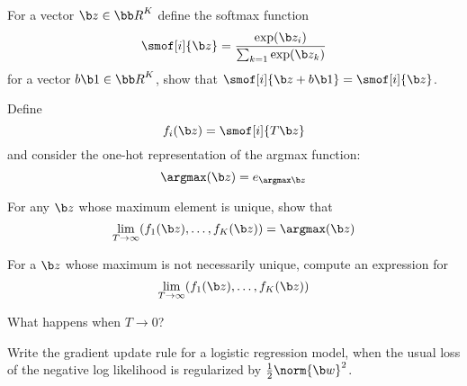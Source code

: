 \bexerc

    \benum
        \item For a vector $\b z\in{\bb R}^K$ define the softmax function
        $$ \smof[i]{\b z} = \frac{\exp(\b z_i)}{\sum_{k=1}\exp(\b z_k)} $$
        for a vector $b\b 1\in{\bb R}^K$, show that $\smof[i]{\b z+b\b1}=\smof[i]{\b z}$. 
        \item Define
        $$ f_i(\b z) = \smof[i]{T\b z} $$
        and consider the {\emphcolor one-hot} representation of the argmax function:
        $$ \argmax(\b z) = e_{\argmax\b z} $$
        \benum
            \item For any $\b z$ whose maximum element is unique, show that
            $$ \lim_{T\to\infty}(f_1(\b z),\dots,f_K(\b z)) = \argmax(\b z) $$
            \item For a $\b z$ whose maximum is not necessarily unique, compute an expression for
            $$\lim_{T\to\infty}(f_1(\b z),\dots,f_K(\b z))$$
            \item What happens when $T\to0$?
        \eenum
        \item Write the gradient update rule for a logistic regression model, when the usual loss of the negative log likelihood is regularized by $\frac12\norm{\b w}^2$.
    \eenum

\eexerc

